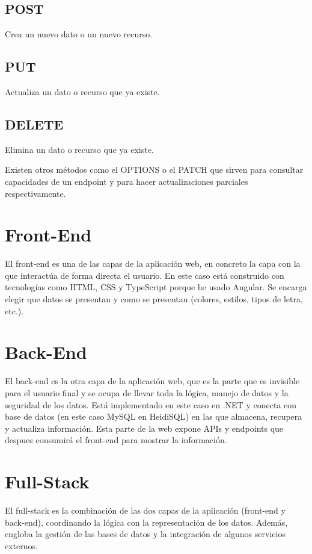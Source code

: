 \subsection{POST}
Crea un nuevo dato o un nuevo recurso.

\subsection{PUT}
Actualiza un dato o recurso que ya existe.

\subsection{DELETE}
Elimina un dato o recurso que ya existe.

Existen otros métodos como el OPTIONS o el PATCH que sirven para consultar capacidades de un endpoint
y para hacer actualizaciones parciales respectivamente.


\section{Front-End}
El front-end es una de las capas de la aplicación web, en concreto la capa con la que interactúa de forma directa el usuario. En este caso está construido con tecnologías como HTML, CSS y TypeScript porque he usado Angular. Se encarga elegir que datos se presentan y como se presentan (colores, estilos, tipos de letra, etc.).

\section{Back-End}
El back-end es la otra capa de la aplicación web, que es la parte que es invisible para el usuario final y se ocupa de llevar toda la lógica, manejo de datos y la seguridad de los datos. Está implementado en este caso en .NET y conecta con base de datos (en este caso MySQL en HeidiSQL) en las que almacena, recupera y actualiza información. Esta parte de la web expone APIs y endpoints que despues consumirá el front-end para mostrar la información.

\section{Full-Stack}
El full-stack es la combinación de las dos capas de la aplicación (front-end y back-end), coordinando la lógica con la representación de los datos. Además, engloba la gestión de las bases de datos y la integración de algunos servicios externos.

